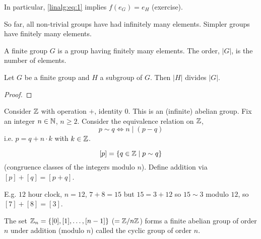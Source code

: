 \documentclass[10pt, a4paper]{article}
\begin{document}
In particular,
\eqref{linalg:eq:1} implies $f(e_G) = e_H$
(exercise).

So far,
all non-trivial groups have had infinitely many elements.
Simpler groups have finitely many elements.

\begin{definition}
    A finite group $G$ is a group having finitely many elements.
    The order,
    $|G|$,
    is the number of elements.
\end{definition}

\begin{theorem}[Lagrange]
    Let $G$ be a finite group and $H$ a subgroup of $G$.
    Then $|H|$ divides $|G|$.

    \begin{proof}
        
    \end{proof}
\end{theorem}

\begin{example}
    Consider $\mathbb{Z}$ with operation $+$,
    identity $0$.
    This is an
    (infinite)
    abelian group.
    Fix an integer $n \in \mathbb{N}$,
    $n \geq 2$.
    Consider the equivalence relation on $\mathbb{Z}$,
    \[
    p \sim q \iff n \mid (p - q)
    \]
    i.e. $p = q + n\cdot k$ with $k \in \mathbb{Z}$.

    \[
    [p] = \{q \in \mathbb{Z}\mid p \sim q\}
    \]
    (congruence classes of the integers modulo $n$).
    Define addition via $[p] + [q] = [p + q]$.

    E.g. $12$ hour clock,
    $n = 12$,
    $7 + 8 = 15$ but $15 = 3 + 12$ so $15 \sim 3$ modulo $12$,
    so $[7] + [8] = [3]$.
    
    The set $\mathbb{Z}_n = \{[0], [1], \dotsc, [n - 1]\}$
    ($=\mathbb{Z} / n\mathbb{Z}$)
    forms a finite abelian group of order $n$ under addition
    (modulo $n$)
    called the cyclic group of order $n$.
\end{example}
\end{document}
